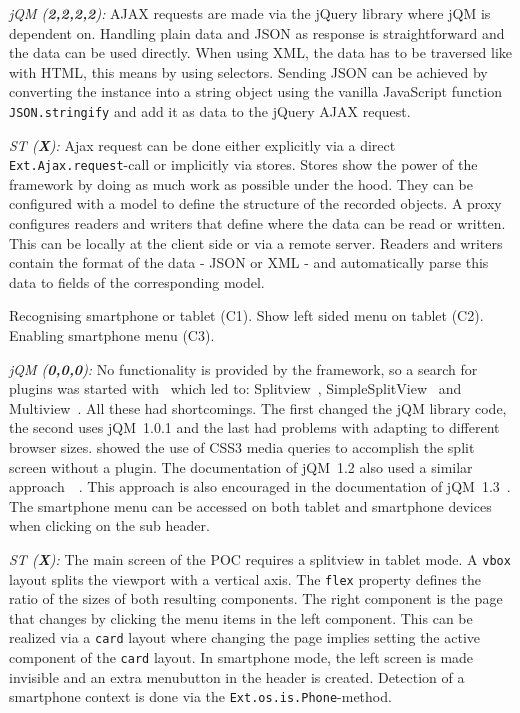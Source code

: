 \documentclass[a4paper]{artikel3}
\newcommand{\code}[1]{\texttt{#1}}
\renewcommand{\paragraph}[1]{\vspace{2mm} \noindent {\bf #1}  }
\newcommand{\framework}[2]{ \emph{#1 (\textbf{#2}): }} %
\newcommand{\challenge}[1]{\paragraph{#1}}
\begin{document}
\framework{jQM}{2,2,2,2}
AJAX requests are made via the jQuery library where jQM is dependent on.
Handling plain data and JSON as response is straightforward and the data can be used directly.
When using XML, the data has to be traversed like with HTML, this means by using selectors.
Sending JSON can be achieved by converting the instance into a string object using the vanilla JavaScript function \code{JSON.stringify} and add it as data to the jQuery AJAX request.

\framework{ST}{X}
Ajax request can be done either explicitly via a direct \code{Ext.Ajax.request}-call or implicitly via stores.  Stores show the power of the framework by doing as much work as possible under the hood.  They can be configured with a model to define the structure of the recorded objects.  A proxy configures readers and writers that define where the data can be read or written.  This can be locally at the client side or via a remote server.  Readers and writers contain the format of the data - JSON or XML - and automatically parse this data to fields of the corresponding model. 

\challenge{Device-specific layout (C1,C2,C3)}
Recognising smartphone or tablet (C1).
Show left sided menu on tablet (C2).
Enabling smartphone menu (C3).

\framework{jQM}{0,0,0}
No functionality is provided by the framework, so a search for plugins was started with~\cite{Deering2012} which led to: Splitview~\cite{Rahman2013}, SimpleSplitView~\cite{Yared2013} and Multiview~\cite{Franck2012}. 
All these had shortcomings. The first changed the jQM library code, the second uses jQM~1.0.1 and the last had problems with adapting to different browser sizes.
\cite{Hadlock2012} showed the use of CSS3 media queries to accomplish the split screen without a plugin.
The documentation of jQM~1.2 also used a similar approach~~\cite{JQuery2012b}.
This approach is also encouraged in the documentation of jQM~1.3~\cite{JQuery2013e}.
The smartphone menu can be accessed on both tablet and smartphone devices when clicking on the sub header.

\framework{ST}{X}
The main screen of the POC requires a splitview in tablet mode.  A \code{vbox} layout splits the viewport with a vertical axis.  The \code{flex} property defines the ratio of the sizes of both resulting components.  The right component is the page that changes by clicking the menu items in the left component.  This can be realized via a \code{card} layout where changing the page implies setting the active component of the \code{card} layout.
In smartphone mode,  the left screen is made invisible and an extra menubutton in the header is created.  Detection of a smartphone context is done via the \code{Ext.os.is.Phone}-method.    
\end{document}
